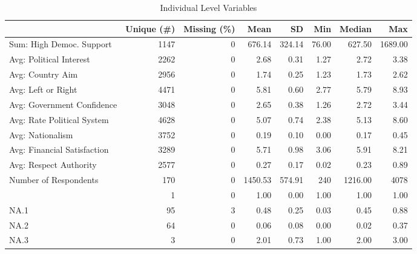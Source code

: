 \begin{table}

\caption{\label{tab:}Individual Level Variables}
\centering
\begin{tabular}[t]{lrrrrrrr}
\toprule
  & Unique (\#) & Missing (\%) & Mean & SD & Min & Median & Max\\
\midrule
Sum: High Democ. Support & 1147 & 0 & 676.14 & 324.14 & 76.00 & 627.50 & 1689.00\\
Avg: Political Interest & 2262 & 0 & 2.68 & 0.31 & 1.27 & 2.72 & 3.38\\
Avg: Country Aim & 2956 & 0 & 1.74 & 0.25 & 1.23 & 1.73 & 2.62\\
Avg: Left or Right & 4471 & 0 & 5.81 & 0.60 & 2.77 & 5.79 & 8.93\\
Avg: Government Confidence & 3048 & 0 & 2.65 & 0.38 & 1.26 & 2.72 & 3.44\\
Avg: Rate Political System & 4628 & 0 & 5.07 & 0.74 & 2.38 & 5.13 & 8.60\\
Avg: Nationalism & 3752 & 0 & 0.19 & 0.10 & 0.00 & 0.17 & 0.45\\
Avg: Financial Satisfaction & 3289 & 0 & 5.71 & 0.98 & 3.06 & 5.91 & 8.21\\
Avg: Respect Authority & 2577 & 0 & 0.27 & 0.17 & 0.02 & 0.23 & 0.89\\
Number of Respondents & 170 & 0 & 1450.53 & 574.91 & 240 & 1216.00 & 4078\\
 & 1 & 0 & 1.00 & 0.00 & 1.00 & 1.00 & 1.00\\
NA.1 & 95 & 3 & 0.48 & 0.25 & 0.03 & 0.45 & 0.88\\
NA.2 & 64 & 0 & 0.06 & 0.08 & 0.00 & 0.02 & 0.37\\
NA.3 & 3 & 0 & 2.01 & 0.73 & 1.00 & 2.00 & 3.00\\
\bottomrule
\end{tabular}
\end{table}
